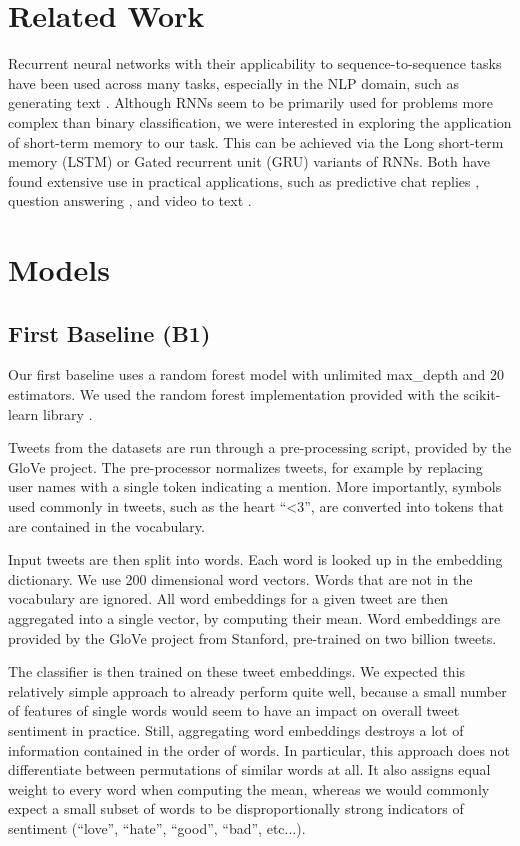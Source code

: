 \documentclass[10pt,conference,compsocconf]{IEEEtran}
\begin{document}
\section{Related Work}

Recurrent neural networks with their applicability to
sequence-to-sequence tasks have been used across many tasks,
especially in the NLP domain, such as generating text \cite{Sutskever}.
Although RNNs seem to be primarily used for problems more
complex than binary classification, we were interested in exploring
the application of short-term memory to our task. This can be achieved
via the Long short-term memory (LSTM) or Gated recurrent unit (GRU)
variants of RNNs. Both have found extensive use in practical
applications, such as predictive chat replies \cite{allo},
question answering \cite{DiWang}, and video to text \cite{DBLP}.

\section{Models}

\subsection{First Baseline (B1)}

Our first baseline uses a random forest model with unlimited
max\_depth and 20 estimators. We used the random forest implementation
provided with the scikit-learn library \cite{scikit-learn}.

Tweets from the datasets are run through a pre-processing script,
provided by the GloVe project. The pre-processor normalizes tweets,
for example by replacing user names with a single token indicating a
mention. More importantly, symbols used commonly in tweets, such as
the heart ``<3'', are converted into tokens that are contained in the
vocabulary.

Input tweets are then split into words. Each word is looked up in the
embedding dictionary. We use 200 dimensional word vectors. Words that
are not in the vocabulary are ignored. All word embeddings for a given
tweet are then aggregated into a single vector, by computing their
mean. Word embeddings are provided by the GloVe \cite{glove} project
from Stanford, pre-trained on two billion tweets.

The classifier is then trained on these tweet embeddings. We expected
this relatively simple approach to already perform quite well, because
a small number of features of single words would seem to have an
impact on overall tweet sentiment in practice. Still, aggregating word
embeddings destroys a lot of information contained in the order of
words. In particular, this approach does not differentiate between
permutations of similar words at all. It also assigns equal weight to
every word when computing the mean, whereas we would commonly expect a
small subset of words to be disproportionally strong indicators of
sentiment (``love'', ``hate'', ``good'', ``bad'', etc...).
\end{document}
